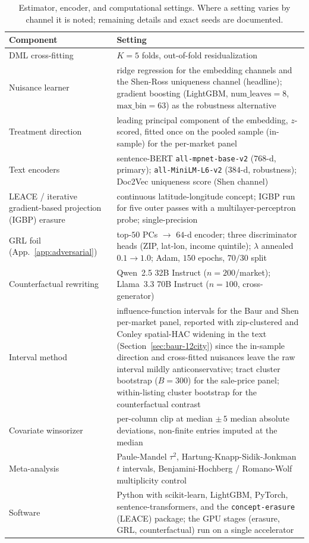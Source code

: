 \begin{table}[H]
\centering
\caption{Estimator, encoder, and computational settings. Where a setting varies by channel it is noted; remaining details and exact seeds are documented.}
\label{tab:hyperparams}
\small
\begin{tabular}{p{} p{}}
\toprule
Component & Setting \\
\midrule
DML cross-fitting & $K = 5$ folds, out-of-fold residualization \citep{chernozhukov2018double} \\
Nuisance learner & ridge regression for the embedding channels and the Shen-Ross uniqueness channel (headline); gradient boosting (LightGBM, $\text{num\_leaves}=8$, $\text{max\_bin}=63$) as the robustness alternative \\
Treatment direction & leading principal component of the embedding, $z$-scored, fitted once on the pooled sample (in-sample) for the per-market panel \\
Text encoders & sentence-BERT \texttt{all-mpnet-base-v2} ($768$-d, primary); \texttt{all-MiniLM-L6-v2} ($384$-d, robustness); Doc2Vec uniqueness score (Shen channel) \\
LEACE / iterative gradient-based projection (IGBP) erasure & continuous latitude-longitude concept; IGBP run for five outer passes with a multilayer-perceptron probe; single-precision \\
GRL foil (App.~\ref{app:adversarial}) & top-$50$ PCs $\rightarrow$ $64$-d encoder; three discriminator heads (ZIP, lat-lon, income quintile); $\lambda$ annealed $0.1\!\to\!1.0$; Adam, $150$ epochs, $70/30$ split \\
Counterfactual rewriting & Qwen~2.5 32B Instruct ($n=200$/market); Llama~3.3 70B Instruct ($n=100$, cross-generator) \\
Interval method & influence-function intervals for the Baur and Shen per-market panel, reported with zip-clustered and Conley spatial-HAC widening in the text (Section~\ref{sec:baur-12city}) since the in-sample direction and cross-fitted nuisances leave the raw interval mildly anticonservative; tract cluster bootstrap ($B=300$) for the sale-price panel; within-listing cluster bootstrap for the counterfactual contrast \\
Covariate winsorizer & per-column clip at median $\pm\,5$ median absolute deviations, non-finite entries imputed at the median \\
Meta-analysis & Paule-Mandel $\tau^2$, Hartung-Knapp-Sidik-Jonkman $t$ intervals, Benjamini-Hochberg / Romano-Wolf multiplicity control \\
Software & Python with scikit-learn, LightGBM, PyTorch, sentence-transformers, and the \texttt{concept-erasure} (LEACE) package; the GPU stages (erasure, GRL, counterfactual) run on a single accelerator \\
\bottomrule
\end{tabular}
\end{table}
